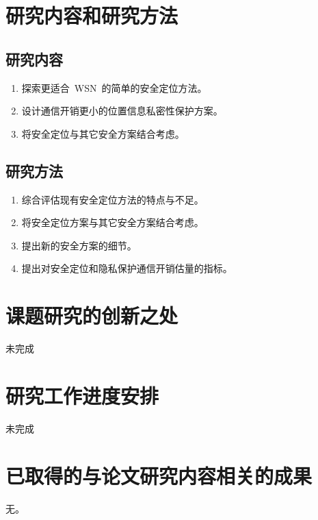 \documentclass[a4paper,10pt]{article}
\begin{document}
\section{研究内容和研究方法} 

\subsection{研究内容}

\begin{enumerate}

\item 探索更适合~WSN~的简单的安全定位方法。

\item 设计通信开销更小的位置信息私密性保护方案。

\item 将安全定位与其它安全方案结合考虑。

\end{enumerate}

\subsection{研究方法}

\begin{enumerate}

\item 综合评估现有安全定位方法的特点与不足。

\item 将安全定位方案与其它安全方案结合考虑。

\item 提出新的安全方案的细节。

\item 提出对安全定位和隐私保护通信开销估量的指标。

\end{enumerate}


\section{课题研究的创新之处}

未完成

\section{研究工作进度安排}

未完成

\section{已取得的与论文研究内容相关的成果} 

无。



\end{document}
